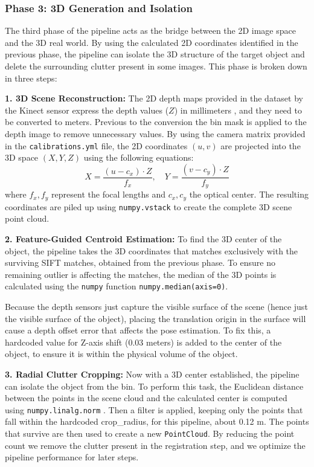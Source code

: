 \subsubsection{Phase 3: 3D Generation and Isolation}
The third phase of the pipeline acts as the bridge between the 2D image space and the 3D real world. By using the calculated 2D coordinates identified in the previous phase, the pipeline can isolate the 3D structure of the target object and delete the surrounding clutter present in some images. This phase is broken down in three steps:

\textbf{1. 3D Scene Reconstruction:} 
The 2D depth maps provided in the dataset by the Kinect sensor express the depth values ($Z$) in millimeters \cite{Kurillo2022}, and they need to be converted to meters. Previous to the conversion the bin mask is applied to the depth image to remove unnecessary values. By using the camera matrix provided in the \texttt{calibrations.yml} file, the 2D coordinates $(u, v)$ are projected into the 3D space $(X, Y, Z)$ using the following equations:
\begin{equation}
    X = \frac{(u - c_x) \cdot Z}{f_x}, \quad Y = \frac{(v - c_y) \cdot Z}{f_y}
\end{equation}
where $f_x, f_y$ represent the focal lengths and $c_x, c_y$ the optical center. The resulting coordinates are piled up using \texttt{numpy.vstack} to create the complete 3D scene point cloud.

\textbf{2. Feature-Guided Centroid Estimation:} 
To find the 3D center of the object, the pipeline takes the 3D coordinates that matches exclusively with the surviving SIFT matches, obtained from the previous phase. To ensure no remaining outlier is affecting the matches, the median of the 3D points is calculated using the \texttt{numpy} function \texttt{numpy.median(axis=0)}.

Because the depth sensors just capture the visible surface of the scene (hence just the visible surface of the object), placing the translation origin in the surface will cause a depth offset error that affects the pose estimation. To fix this, a hardcoded value for Z-axis shift (0.03 meters) is added to the center of the object, to ensure it is within the physical volume of the object.

\textbf{3. Radial Clutter Cropping:} 
Now with a 3D center established, the pipeline can isolate the object from the bin. To perform this task, the Euclidean distance between the points in the scene cloud and the calculated center is computed using \texttt{numpy.linalg.norm} \cite{NumPy2025}. Then a filter is applied, keeping only the points that fall within the hardcoded crop\_radius, for this pipeline, about 0.12 m. The points that survive are then used to create a new \texttt{PointCloud}. By reducing the point count we remove the clutter present in the registration step, and we optimize the pipeline performance for later steps.

